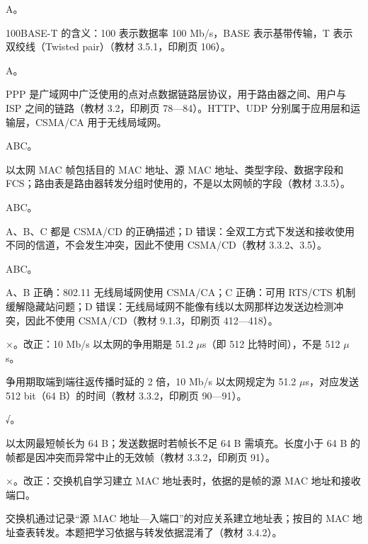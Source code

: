\documentclass[a4paper,11pt]{article}
\begin{document}
\q A。\begin{analysis}100BASE-T 的含义：100 表示数据率 100 Mb/s，BASE 表示基带传输，T 表示双绞线（Twisted pair）（教材 3.5.1，印刷页 106）。\end{analysis}

\q A。\begin{analysis}PPP 是广域网中广泛使用的点对点数据链路层协议，用于路由器之间、用户与 ISP 之间的链路（教材 3.2，印刷页 78—84）。HTTP、UDP 分别属于应用层和运输层，CSMA/CA 用于无线局域网。\end{analysis}


\q ABC。\begin{analysis}以太网 MAC 帧包括目的 MAC 地址、源 MAC 地址、类型字段、数据字段和 FCS；路由表是路由器转发分组时使用的，不是以太网帧的字段（教材 3.3.5）。\end{analysis}

\q ABC。\begin{analysis}A、B、C 都是 CSMA/CD 的正确描述；D 错误：全双工方式下发送和接收使用不同的信道，不会发生冲突，因此不使用 CSMA/CD（教材 3.3.2、3.5）。\end{analysis}

\q ABC。\begin{analysis}A、B 正确：802.11 无线局域网使用 CSMA/CA；C 正确：可用 RTS/CTS 机制缓解隐藏站问题；D 错误：无线局域网不能像有线以太网那样边发送边检测冲突，因此不使用 CSMA/CD（教材 9.1.3，印刷页 412—418）。\end{analysis}


\q ×。改正：10 Mb/s 以太网的争用期是 51.2 $\mu$s（即 512 比特时间），不是 512 $\mu$s。\begin{analysis}争用期取端到端往返传播时延的 2 倍，10 Mb/s 以太网规定为 51.2 $\mu$s，对应发送 512 bit（64 B）的时间（教材 3.3.2，印刷页 90—91）。\end{analysis}

\q √。\begin{analysis}以太网最短帧长为 64 B；发送数据时若帧长不足 64 B 需填充。长度小于 64 B 的帧都是因冲突而异常中止的无效帧（教材 3.3.2，印刷页 91）。\end{analysis}

\q ×。改正：交换机自学习建立 MAC 地址表时，依据的是帧的源 MAC 地址和接收端口。\begin{analysis}交换机通过记录“源 MAC 地址—入端口”的对应关系建立地址表；按目的 MAC 地址查表转发。本题把学习依据与转发依据混淆了（教材 3.4.2）。\end{analysis}
\end{document}
